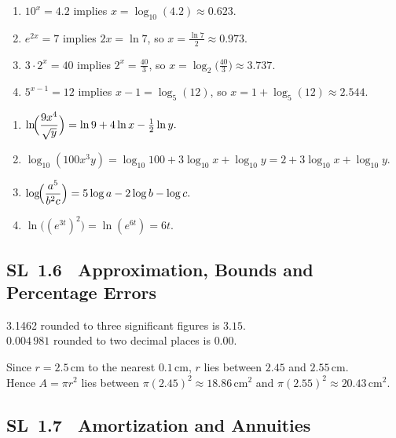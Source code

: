 \documentclass[11pt]{article}
\newcommand{\tocsubsection}[1]{\subsection{#1}}
\begin{document}
\begin{solution}
\begin{enumerate}[label=(\alph*)]
\item $10^{x}=4.2$ implies $x=\log_{10}(4.2)\approx 0.623$.
\item $e^{2x}=7$ implies $2x=\ln 7$, so $x=\frac{\ln 7}{2}\approx 0.973$.
\item $3\cdot 2^x=40$ implies $2^x=\frac{40}{3}$, so $x=\log_{2}\!\bigl(\tfrac{40}{3}\bigr)\approx 3.737$.
\item $5^{x-1}=12$ implies $x-1=\log_{5}(12)$, so $x=1+\log_{5}(12)\approx 2.544$.
\end{enumerate}
\end{solution}

\begin{solution}
\begin{enumerate}[label=(\alph*)]
\item $\displaystyle \ln\!\Bigl(\frac{9x^4}{\sqrt{y}}\Bigr) = \ln 9 + 4\ln x - \tfrac{1}{2}\ln y.$
\item $\displaystyle \log_{10}(100x^3y) = \log_{10}100 + 3\log_{10}x + \log_{10}y = 2 + 3\log_{10}x + \log_{10}y.$
\item $\displaystyle \log\!\Bigl(\frac{a^5}{b^2 c}\Bigr) = 5\log a - 2\log b - \log c.$
\item $\displaystyle \ln\!\bigl((e^{3t})^2\bigr) = \ln(e^{6t}) = 6t.$
\end{enumerate}
\end{solution}

\tocsubsection{SL 1.6 \; Approximation, Bounds and Percentage Errors}

\begin{solution}
3.1462 rounded to three significant figures is $3.15$.  \\
$0.004\,981$ rounded to two decimal places is $0.00$.
\end{solution}

\begin{solution}
Since $r=2.5$\,cm to the nearest $0.1$\,cm, $r$ lies between $2.45$ and $2.55$\,cm.\\
Hence $A=\pi r^2$ lies between $\pi(2.45)^2\approx 18.86\,\text{cm}^2$ and $\pi(2.55)^2\approx 20.43\,\text{cm}^2$.
\end{solution}


\tocsubsection{SL 1.7 \; Amortization and Annuities}
\end{document}
